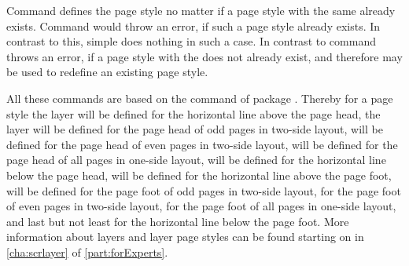 Command  defines the page style no matter if a page style
with the same  already exists. Command  would
throw an error, if such a page style already exists. In contrast to this,
 simple does nothing in such a case. In contrast to
 command  throws an error, if a page
style with the  does not already exist, and therefore may be used
to redefine an existing page style.

All these commands are based on the command  of
package . Thereby for a page style  the layer
 will be defined for the horizontal line
above the page head, the layer  will be defined
for the page head of odd pages in two-side layout,
 will be defined for the page head of even
pages in two-side layout,  will be defined
for the page head of all pages in one-side layout,
 will be defined for the horizontal line
below the page head,  will be defined for
the horizontal line above the page foot,  will
be defined for the page foot of odd pages in two-side layout,
 for the page foot of even pages in two-side
layout,  for the page foot of all pages in
one-side layout, and last but not least 
for the horizontal line below the page foot. More information about layers and
layer page styles can be found starting on  in
\autoref{cha:scrlayer} of \autoref{part:forExperts}.%
%
